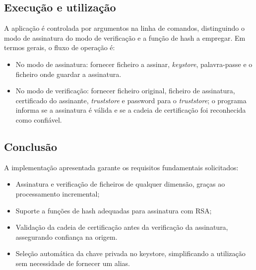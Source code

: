 \subsection{Execução e utilização}

A aplicação é controlada por argumentos na linha de comandos, distinguindo o modo de assinatura do modo de verificação e a função de hash a empregar. Em termos gerais, o fluxo de operação é:

\begin{itemize}
    \item No modo de assinatura: fornecer ficheiro a assinar, \textit{keystore}, palavra-passe e o ficheiro onde guardar a assinatura.
    \item No modo de verificação: fornecer ficheiro original, ficheiro de assinatura, certificado do assinante, \textit{truststore} e password para o \textit{truststore}; o programa informa se a assinatura é válida e se a cadeia de certificação foi reconhecida como confiável.
\end{itemize}

\subsection{Conclusão}

A implementação apresentada garante os requisitos fundamentais solicitados:
\begin{itemize}
    \item Assinatura e verificação de ficheiros de qualquer dimensão, graças ao processamento incremental;
    \item Suporte a funções de hash adequadas para assinatura com RSA;
    \item Validação da cadeia de certificação antes da verificação da assinatura, assegurando confiança na origem.
    \item Seleção automática da chave privada no keystore, simplificando a utilização sem necessidade de fornecer um alias.
\end{itemize}